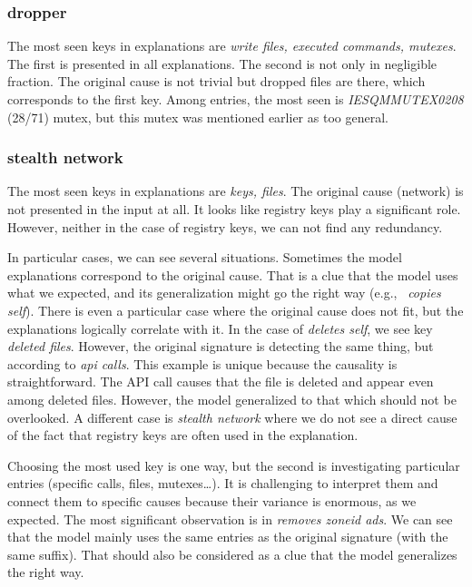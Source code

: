 \subsubsection*{dropper}
The most seen keys in explanations are \emph{write files, executed commands, mutexes}. The first is presented in all explanations. The second is not only in negligible fraction. The original cause is not trivial but dropped files are there, which corresponds to the first key. Among entries, the most seen is \emph{IESQMMUTEX0208} (28/71) mutex, but this mutex was mentioned earlier as too general.

\subsubsection*{stealth network}
The most seen keys in explanations are \emph{keys, files}. The original cause (network) is not presented in the input at all. It looks like registry keys play a significant role. However, neither in the case of registry keys, we can not find any redundancy.

\hfill \break

In particular cases, we can see several situations. Sometimes the model explanations correspond to the original cause. That is a clue that the model uses what we expected, and its generalization might go the right way (e.g., \ \emph{copies self}). There is even a particular case where the original cause does not fit, but the explanations logically correlate with it. In the case of \emph{deletes self}, we see key \emph{deleted files}. However, the original signature is detecting the same thing, but according to \emph{api calls}. This example is unique because the causality is straightforward. The API call causes that the file is deleted and appear even among deleted files. However, the model generalized to that which should not be overlooked. A different case is \emph{stealth network} where we do not see a direct cause of the fact that registry keys are often used in the explanation.

Choosing the most used key is one way, but the second is investigating particular entries (specific calls, files, mutexes\dots). It is challenging to interpret them and connect them to specific causes because their variance is enormous, as we expected. The most significant observation is in \emph{removes zoneid ads}. We can see that the model mainly uses the same entries as the original signature (with the same suffix). That should also be considered as a clue that the model generalizes the right way.

